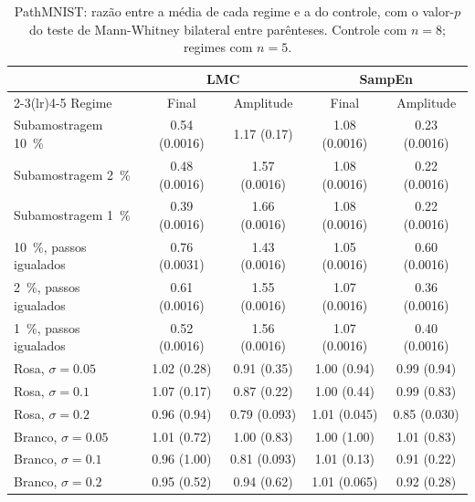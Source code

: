 \begin{table}[H]
    \centering
    \caption{PathMNIST: razão entre a média de cada regime e a do controle,
    com o valor-$p$ do teste de Mann-Whitney bilateral entre parênteses.
    Controle com $n = 8$; regimes com $n = 5$.}
    \label{tab:pm-comparacao}
    \footnotesize
    \begin{tabular}{lcccc}
        \toprule
        & \multicolumn{2}{c}{LMC} & \multicolumn{2}{c}{SampEn} \\
        \cmidrule(lr){2-3}\cmidrule(lr){4-5}
        Regime & Final & Amplitude & Final & Amplitude \\
        \midrule
        Subamostragem \SI{10}{\percent} & \num{0,54} (\num{0,0016}) & \num{1,17} (\num{0,17}) & \num{1,08} (\num{0,0016}) & \num{0,23} (\num{0,0016}) \\
        Subamostragem \SI{2}{\percent}  & \num{0,48} (\num{0,0016}) & \num{1,57} (\num{0,0016}) & \num{1,08} (\num{0,0016}) & \num{0,22} (\num{0,0016}) \\
        Subamostragem \SI{1}{\percent}  & \num{0,39} (\num{0,0016}) & \num{1,66} (\num{0,0016}) & \num{1,08} (\num{0,0016}) & \num{0,22} (\num{0,0016}) \\
        \midrule
        \SI{10}{\percent}, passos igualados & \num{0,76} (\num{0,0031}) & \num{1,43} (\num{0,0016}) & \num{1,05} (\num{0,0016}) & \num{0,60} (\num{0,0016}) \\
        \SI{2}{\percent}, passos igualados  & \num{0,61} (\num{0,0016}) & \num{1,55} (\num{0,0016}) & \num{1,07} (\num{0,0016}) & \num{0,36} (\num{0,0016}) \\
        \SI{1}{\percent}, passos igualados  & \num{0,52} (\num{0,0016}) & \num{1,56} (\num{0,0016}) & \num{1,07} (\num{0,0016}) & \num{0,40} (\num{0,0016}) \\
        \midrule
        Rosa, $\sigma = \num{0,05}$   & \num{1,02} (\num{0,28}) & \num{0,91} (\num{0,35}) & \num{1,00} (\num{0,94}) & \num{0,99} (\num{0,94}) \\
        Rosa, $\sigma = \num{0,1}$    & \num{1,07} (\num{0,17}) & \num{0,87} (\num{0,22}) & \num{1,00} (\num{0,44}) & \num{0,99} (\num{0,83}) \\
        Rosa, $\sigma = \num{0,2}$    & \num{0,96} (\num{0,94}) & \num{0,79} (\num{0,093}) & \num{1,01} (\num{0,045}) & \num{0,85} (\num{0,030}) \\
        Branco, $\sigma = \num{0,05}$ & \num{1,01} (\num{0,72}) & \num{1,00} (\num{0,83}) & \num{1,00} (\num{1,00}) & \num{1,01} (\num{0,83}) \\
        Branco, $\sigma = \num{0,1}$  & \num{0,96} (\num{1,00}) & \num{0,81} (\num{0,093}) & \num{1,01} (\num{0,13}) & \num{0,91} (\num{0,22}) \\
        Branco, $\sigma = \num{0,2}$  & \num{0,95} (\num{0,52}) & \num{0,94} (\num{0,62}) & \num{1,01} (\num{0,065}) & \num{0,92} (\num{0,28}) \\
        \bottomrule
    \end{tabular}
\end{table}

